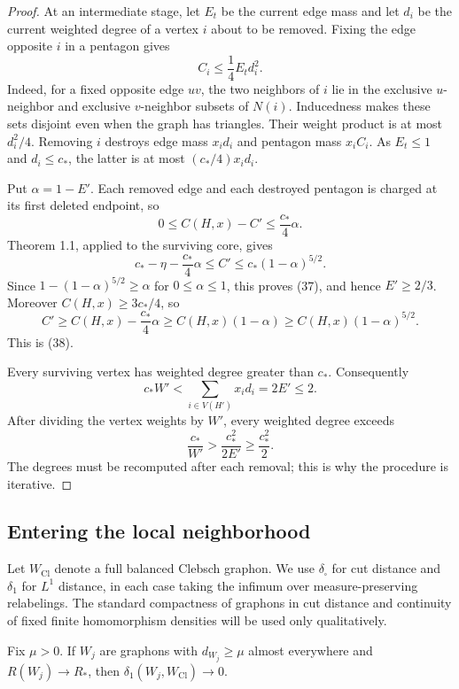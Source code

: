 \begin{proof}
At an intermediate stage, let $E_t$ be the current edge mass and let $d_i$
be the current weighted degree of a vertex $i$ about to be removed. Fixing
the edge opposite $i$ in a pentagon gives
\[
 C_i\leq\frac14 E_t d_i^2.
\]
Indeed, for a fixed opposite edge $uv$, the two neighbors of $i$ lie in the
exclusive $u$-neighbor and exclusive $v$-neighbor subsets of $N(i)$.
Inducedness makes these sets disjoint even when the graph has triangles.
Their weight product is at most $d_i^2/4$. Removing $i$ destroys edge mass
$x_i d_i$ and pentagon mass $x_i C_i$. As $E_t\leq1$ and $d_i\leq c_\ast$,
the latter is at most $(c_\ast/4)x_i d_i$.

Put $\alpha=1-E'$. Each removed edge and each destroyed pentagon is charged
at its first deleted endpoint, so
\begin{equation}\tag{40}\label{eq:40}
 0\leq C(H,x)-C'\leq\frac{c_\ast}4\alpha.
\end{equation}
Theorem 1.1, applied to the surviving core, gives
\[
 c_\ast-\eta-\frac{c_\ast}4\alpha\leq C'
 \leq c_\ast(1-\alpha)^{5/2}.
\]
Since $1-(1-\alpha)^{5/2}\geq\alpha$ for $0\leq\alpha\leq1$, this proves
(37), and hence $E'\geq2/3$. Moreover $C(H,x)\geq3c_\ast/4$, so
\[
 C'\geq C(H,x)-\frac{c_\ast}4\alpha
 \geq C(H,x)(1-\alpha)\geq C(H,x)(1-\alpha)^{5/2}.
\]
This is (38).

Every surviving vertex has weighted degree greater than $c_\ast$.
Consequently
\[
 c_\ast W'<\sum_{i\in V(H')}x_i d_i=2E'\leq2.
\]
After dividing the vertex weights by $W'$, every weighted degree exceeds
\[
 \frac{c_\ast}{W'}>\frac{c_\ast^2}{2E'}\geq\frac{c_\ast^2}2.
\]
The degrees must be recomputed after each removal; this is why the procedure
is iterative.
\end{proof}

\subsection{Entering the local neighborhood}
Let $W_{\mathrm{Cl}}$ denote a full balanced Clebsch graphon. We use
$\delta_\square$ for cut distance and $\delta_1$ for $L^1$ distance, in each
case taking the infimum over measure-preserving relabelings. The standard
compactness of graphons in cut distance and continuity of fixed finite
homomorphism densities will be used only qualitatively.

\begin{lemma}\label{lem:positive-degree-compactness}
Fix $\mu>0$. If $W_j$ are graphons with $d_{W_j}\geq\mu$ almost everywhere
and $R(W_j)\to R_\ast$, then $\delta_1(W_j,W_{\mathrm{Cl}})\to0$.
\end{lemma}

